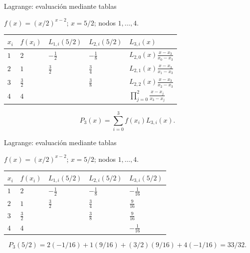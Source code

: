 \documentclass[main.tex]{subfiles}
\begin{document}
\begin{frame}[t]{Lagrange: evaluación mediante tablas}
\par\noindent\begin{minipage}[t][12mm][t]{\textwidth}\small\strut $f(x)=(x/2)^{x-2}$; $x=5/2$; nodos $1,\ldots,4$.\end{minipage}\par\nointerlineskip
\begin{minipage}[t]{\textwidth}\begingroup\scriptsize\setlength{\tabcolsep}{3pt}\begin{center}\begin{tabular}{|C{.065\textwidth}|C{.095\textwidth}|C{.19\textwidth}|C{.25\textwidth}|C{.25\textwidth}|}\hline
\rule[-2mm]{0pt}{6mm}$x_i$&$f(x_i)$&$L_{1,i}(5/2)$&$L_{2,i}(5/2)$&$L_{3,i}(x)$\\\hline
\rule[-2.5mm]{0pt}{9mm}$1$&$2$&$-\frac12$&$-\frac18$&$L_{2,0}(x)\frac{x-x_3}{x_0-x_3}$\\\hline
\rule[-2.5mm]{0pt}{9mm}$2$&$1$&$\frac32$&$\frac34$&$L_{2,1}(x)\frac{x-x_3}{x_1-x_3}$\\\hline
\rule[-2.5mm]{0pt}{9mm}$3$&$\frac{3}{2}$&&$\frac38$&$L_{2,2}(x)\frac{x-x_3}{x_2-x_3}$\\\hline
\rule[-2.5mm]{0pt}{9mm}$4$&$4$&&&$\prod_{j=0}^2\frac{x-x_j}{x_3-x_j}$\\\hline
\end{tabular}\end{center}\endgroup\par
\end{minipage}\par\[P_3(x)=\sum_{i=0}^3f(x_i)L_{3,i}(x).\]
\end{frame}
\begin{frame}[t]{Lagrange: evaluación mediante tablas}
\par\noindent\begin{minipage}[t][12mm][t]{\textwidth}\small\strut $f(x)=(x/2)^{x-2}$; $x=5/2$; nodos $1,\ldots,4$.\end{minipage}\par\nointerlineskip
\begin{minipage}[t]{\textwidth}\begingroup\scriptsize\setlength{\tabcolsep}{3pt}\begin{center}\begin{tabular}{|C{.065\textwidth}|C{.095\textwidth}|C{.19\textwidth}|C{.25\textwidth}|C{.25\textwidth}|}\hline
\rule[-2mm]{0pt}{6mm}$x_i$&$f(x_i)$&$L_{1,i}(5/2)$&$L_{2,i}(5/2)$&$L_{3,i}(5/2)$\\\hline
\rule[-2.5mm]{0pt}{9mm}$1$&$2$&$-\frac12$&$-\frac18$&$-\frac1{16}$\\\hline
\rule[-2.5mm]{0pt}{9mm}$2$&$1$&$\frac32$&$\frac34$&$\frac9{16}$\\\hline
\rule[-2.5mm]{0pt}{9mm}$3$&$\frac{3}{2}$&&$\frac38$&$\frac9{16}$\\\hline
\rule[-2.5mm]{0pt}{9mm}$4$&$4$&&&$-\frac1{16}$\\\hline
\end{tabular}\end{center}\endgroup\par
\end{minipage}\par\scriptsize\[P_3(5/2)=2(-1/16)+1(9/16)+(3/2)(9/16)+4(-1/16)=33/32.\]
\end{frame}
\end{document}
